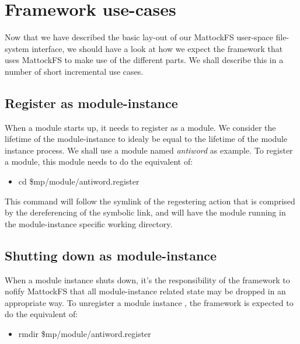 \section{Framework use-cases}
Now that we have described the basic lay-out of our MattockFS user-space file-system interface, we should have a look at how we expect the framework that uses MattockFS to make use of the different parts. We shall describe this in a number of short incremental use cases.
\subsection{Register as module-instance}
When a module starts up, it needs to register as a module. We consider the lifetime of the module-instance to idealy be equal to the lifetime of the module instance process. We shall use a module named \emph{antiword} as example. To register a module, this module needs to do the equivalent of:
\begin{itemize}
\item cd \$mp/module/antiword.register
\end{itemize} 
This command will follow the symlink of the regestering action that is comprised by the dereferencing of the symbolic link, and will have the module running in the module-instance specific working directory.
\subsection{Shutting down as module-instance}
When a module instance shuts down, it's the responsibility of the framework to nofify MattockFS that all module-instance related state may be dropped in an appropriate way. To unregister a module instance , the framework is expected to do the equivalent of:
\begin{itemize}
\item rmdir \$mp/module/antiword.register
\end{itemize}

